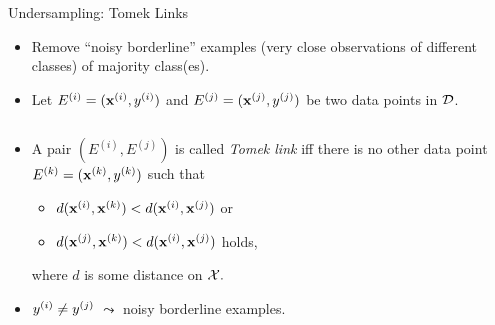 \documentclass[11pt,compress,t,notes=noshow, xcolor=table]{beamer}
\begin{document}
\begin{frame}{Undersampling: Tomek Links}
    \small{

        \begin{itemize}            
            \item Remove ``noisy borderline'' examples (very close observations of different classes) of majority class(es).
            \item Let $E^{(i)} = (\xi,\yi)$ and $E^{(j)} = (\xv^{(j)},y^{(j)})$ be two data points in $\D$. %
        \end{itemize}
        \begin{columns}
            \begin{column}{0.7\textwidth}	
        
                \begin{itemize}

                    
                    \item A pair $(E^{(i)},E^{(j)})$ is called \emph{Tomek link} iff there is no other data point $E^{(k)} = (\xv^{(k)},y^{(k)})$ such that
        
                    \begin{itemize} 
                    \footnotesize
                
                       \item [] $d(\xv^{(i)}, \xv^{(k)}) < d(\xv^{(i)}, \xv^{(j)}) $ or
                       \item [] $d(\xv^{(j)}, \xv^{(k)}) < d(\xv^{(i)}, \xv^{(j)}) $ holds,
                    
                    \end{itemize}
        
                where $d$ is some distance on $\Xspace.$
                \item $\yi \neq \yi[j]$%
                $\leadsto$ noisy borderline examples.


\end{itemize}
\end{column}
\end{columns}}
\end{frame}
\end{document}
